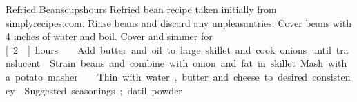 \begin{recipe}{Refried Beans}{\unit[4]{cups}}{\unit[3]{hours}}
\freeform Refried bean recipe taken initially from simplyrecipes.com.
Rinse beans and discard any unpleasantries.  Cover beans with 4 inches
of water and boil.  Cover and simmer for \unit[2]{hours}.
Add butter and oil to large skillet and cook onions until translucent.
\newstep Strain beans and combine with onion and fat in skillet.  Mash with a potato masher.
Thin with water, butter and cheese to desired consistency.
  Suggested seasonings; datil powder
\end{recipe}
